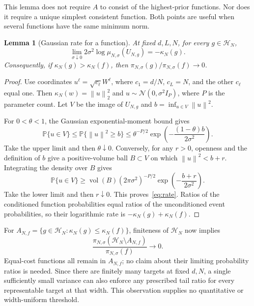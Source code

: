 \documentclass[11pt]{article}
\newtheorem{lemma}[theorem]{Lemma}
\theoremstyle{definition}
\newcommand{\PP}{\mathbb P}
\newcommand{\cH}{\mathcal H}
\newcommand{\norm}[1]{\left\lVert#1\right\rVert}
\begin{document}
This lemma does not require $A$ to consist of the highest-prior functions. Nor does it require a unique simplest consistent function. Both points are useful when several functions have the same minimum norm.

\begin{lemma}[Gaussian rate for a function]\label{lem:rate}
At fixed $d,L,N$, for every $g\in\cH_N$,
\begin{equation}\label{eq:rate}
 \lim_{\sigma\downarrow0}2\sigma^2\log\mu_{N,\sigma}(U_{N,g})=-\kappa_N(g).
\end{equation}
Consequently, if $\kappa_N(g)>\kappa_N(f)$, then $\pi_{N,\sigma}(g)/\pi_{N,\sigma}(f)\to0$.
\end{lemma}
\begin{proof}
Use coordinates $u^\ell=\sqrt{c_\ell}W^\ell$, where $c_1=d/N$, $c_L=N$, and the other $c_\ell$ equal one. Then $\kappa_N(w)=\norm{u}_2^2$ and $u\sim\mathcal N(0,\sigma^2I_P)$, where $P$ is the parameter count. Let $V$ be the image of $U_{N,g}$ and $b=\inf_{u\in V}\norm{u}^2$.

For $0<\theta<1$, the Gaussian exponential-moment bound gives
\[
 \PP\{u\in V\}\leq\PP\{\norm{u}^2\geq b\}
 \leq\theta^{-P/2}\exp\left(-\frac{(1-\theta)b}{2\sigma^2}\right).
\]
Take the upper limit and then $\theta\downarrow0$. Conversely, for any $r>0$, openness and the definition of $b$ give a positive-volume ball $B\subset V$ on which $\norm{u}^2<b+r$. Integrating the density over $B$ gives
\[
 \PP\{u\in V\}\geq\operatorname{vol}(B)(2\pi\sigma^2)^{-P/2}
 \exp\left(-\frac{b+r}{2\sigma^2}\right).
\]
Take the lower limit and then $r\downarrow0$. This proves~\eqref{eq:rate}. Ratios of the conditioned function probabilities equal ratios of the unconditioned event probabilities, so their logarithmic rate is $-\kappa_N(g)+\kappa_N(f)$.
\end{proof}

For $A_{N,f}=\{g\in\cH_N:\kappa_N(g)\leq\kappa_N(f)\}$, finiteness of $\cH_N$ now implies
\begin{equation}\label{eq:tail}
 \frac{\pi_{N,\sigma}(\cH_N\setminus A_{N,f})}{\pi_{N,\sigma}(f)}\longrightarrow0.
\end{equation}
Equal-cost functions all remain in $A_{N,f}$; no claim about their limiting probability ratios is needed. Since there are finitely many targets at fixed $d,N$, a single sufficiently small variance can also enforce any prescribed tail ratio for every representable target at that width. This observation supplies no quantitative or width-uniform threshold.
\end{document}
